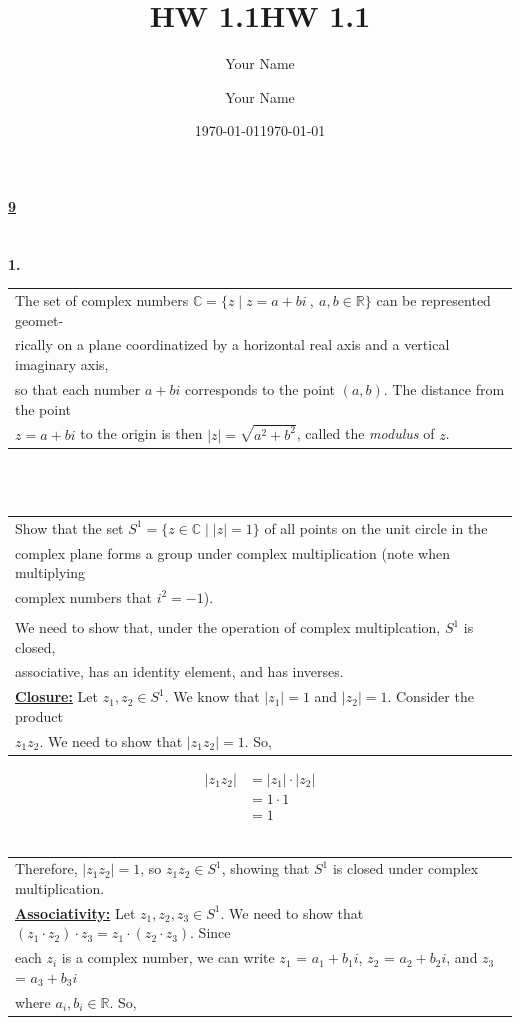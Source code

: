 \documentclass[12pt, letterpaper]{article}
\title{HW 1.1}
\author{Your Name}
\date{\today}
\title{HW 1.1}
\author{Your Name}
\date{\today}
\begin{document}
 
\paragraph{\underline{9} \\ \\}
\textbf{1.} \begin{tabular}[t]{l} 
    The set of complex numbers $\mathbb{C} = \{z \mid z = a + bi\ , \  a, b \in \mathbb{R} \}$ can be represented geomet- \\
    rically on a plane coordinatized by a horizontal real axis and a vertical imaginary axis, \\
    so that each number $a + bi$ corresponds to the point $(a, b)$. The distance from the point \\
    $z = a + bi$ to the origin is then $|z| = \sqrt{a^2 + b^2}$, called the \textit{modulus} of $z$.
    \end{tabular} \hspace{0.2em} \\ 
    \indent \indent \  \begin{tabular}[t]{l}
        Show that the set $S^1 = \{z \in \mathbb{C} \mid |z| = 1\}$ of all points on the unit circle in the \\
        complex plane forms a group under complex multiplication (note when multiplying \\
        complex numbers that $i^2 = -1$). \\ \\
        We need to show that, under the operation of complex multiplcation, $S^1$ is closed, \\
        associative, has an identity element, and has inverses. \vspace{0.5em} \\
        \underline{\textbf{Closure:}} Let $z_1, z_2 \in S^1$. We know that $|z_1| = 1$ and $|z_2| = 1$. Consider the product \\ 
        $z_1z_2$. We need to show that $|z_1z_2| = 1$. So,
    \end{tabular}
    \begin{align*}
        |z_1z_2| &= |z_1| \cdot |z_2| \\
        &= 1 \cdot 1 \\
        &= 1
        \end{align*}
    \indent \indent \ \begin{tabular}[t]{l}
        Therefore, $|z_1z_2| = 1$, so $z_1z_2 \in S^1$, showing that $S^1$ is closed under complex multiplication.   \vspace{0.5em} \\
        \underline{\textbf{Associativity:}} Let $z_1, z_2, z_3 \in S^1$. We need to show that $(z_1 \cdot z_2) \cdot z_3 = z_1 \cdot (z_2 \cdot z_3)$. 
        Since \\ each $z_i$ is a complex number, we can write $z_1$ = $a_1 + b_1i$, $z_2$ = $a_2 + b_2i$, and $z_3$ = $a_3 + b_3i$ \\ 
        where $a_i, b_i \in \mathbb{R}$. So,
    \end{tabular}
\end{document}
